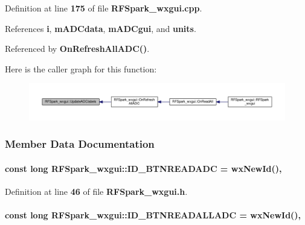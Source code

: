 Definition at line {\bf 175} of file {\bf R\+F\+Spark\+\_\+wxgui.\+cpp}.



References {\bf i}, {\bf m\+A\+D\+Cdata}, {\bf m\+A\+D\+Cgui}, and {\bf units}.



Referenced by {\bf On\+Refresh\+All\+A\+D\+C()}.



Here is the caller graph for this function\+:
\nopagebreak
\begin{figure}[H]
\begin{center}
\leavevmode
\includegraphics[width=350pt]{d0/d75/classRFSpark__wxgui_a0671721bd8ff6cd2eb77cca64f280e2b_icgraph}
\end{center}
\end{figure}




\subsubsection{Member Data Documentation}
\paragraph[{I\+D\+\_\+\+B\+T\+N\+R\+E\+A\+D\+A\+DC}]{\setlength{\rightskip}{0pt plus 5cm}const long R\+F\+Spark\+\_\+wxgui\+::\+I\+D\+\_\+\+B\+T\+N\+R\+E\+A\+D\+A\+DC = wx\+New\+Id()\hspace{0.3cm}{\ttfamily [static]}, {\ttfamily [protected]}}\label{classRFSpark__wxgui_aaca32836a23e351945411cfb2b347513}


Definition at line {\bf 46} of file {\bf R\+F\+Spark\+\_\+wxgui.\+h}.

\paragraph[{I\+D\+\_\+\+B\+T\+N\+R\+E\+A\+D\+A\+L\+L\+A\+DC}]{\setlength{\rightskip}{0pt plus 5cm}const long R\+F\+Spark\+\_\+wxgui\+::\+I\+D\+\_\+\+B\+T\+N\+R\+E\+A\+D\+A\+L\+L\+A\+DC = wx\+New\+Id()\hspace{0.3cm}{\ttfamily [static]}, {\ttfamily [protected]}}\label{classRFSpark__wxgui_a7cd65a6ed7579f0d6475fe9b80f01278}


